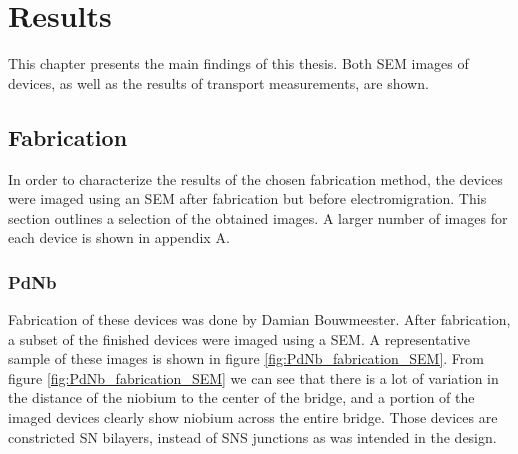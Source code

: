 \section{Results}
\label{section:Results}
This chapter presents the main findings of this thesis. Both SEM images of devices, as well as the results of transport measurements, are shown.


\subsection{Fabrication}
In order to characterize the results of the chosen fabrication method, the devices were imaged using an SEM after fabrication but before electromigration. This section outlines a selection of the obtained images. A larger number of images for each device is shown in appendix A.  

\subsubsection{PdNb}
Fabrication of these devices was done by Damian Bouwmeester. After fabrication, a subset of the finished devices were imaged using a SEM. A representative sample of these images is shown in figure \ref{fig:PdNb_fabrication_SEM}. From figure \ref{fig:PdNb_fabrication_SEM} we can see that there is a lot of variation in the distance of the niobium to the center of the bridge, and a portion of the imaged devices clearly show niobium across the entire bridge. Those devices are constricted SN bilayers, instead of SNS junctions as was intended in the design. 

